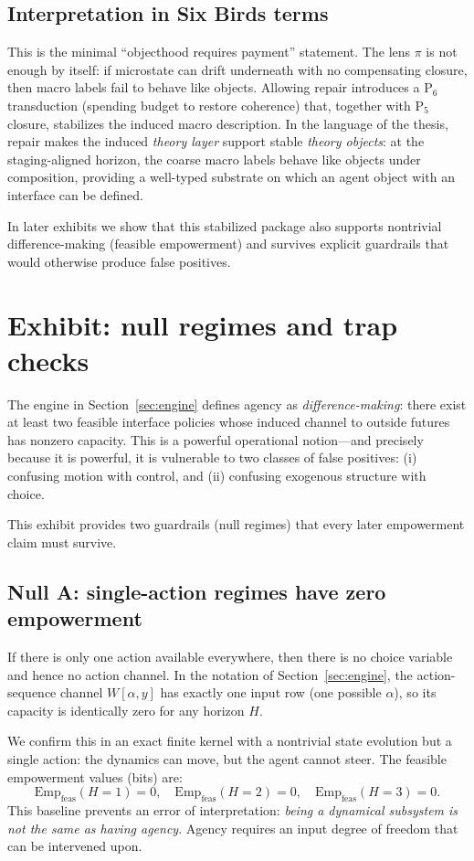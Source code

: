 \documentclass[11pt]{article}
\newcommand{\Emp}{\mathrm{Emp}}
\begin{document}
\subsection{Interpretation in Six Birds terms}
This is the minimal ``objecthood requires payment'' statement. The lens $\pi$ is not enough by itself: if microstate can drift underneath with no compensating closure, then macro labels fail to behave like objects. Allowing repair introduces a P$_6$ transduction (spending budget to restore coherence) that, together with P$_5$ closure, stabilizes the induced macro description. In the language of the thesis, repair makes the induced \emph{theory layer} support stable \emph{theory objects}: at the staging-aligned horizon, the coarse macro labels behave like objects under composition, providing a well-typed substrate on which an agent object with an interface can be defined.

In later exhibits we show that this stabilized package also supports nontrivial difference-making (feasible empowerment) and survives explicit guardrails that would otherwise produce false positives.
 \section{Exhibit: null regimes and trap checks}
\label{sec:ex_nulls}

The engine in Section~\ref{sec:engine} defines agency as \emph{difference-making}: there exist at least two feasible interface policies whose induced channel to outside futures has nonzero capacity. This is a powerful operational notion---and precisely because it is powerful, it is vulnerable to two classes of false positives:
(i) confusing motion with control, and
(ii) confusing exogenous structure with choice.

This exhibit provides two guardrails (null regimes) that every later empowerment claim must survive.

\subsection{Null A: single-action regimes have zero empowerment}
If there is only one action available everywhere, then there is no choice variable and hence no action channel. In the notation of Section~\ref{sec:engine}, the action-sequence channel $W[\alpha,y]$ has exactly one input row (one possible $\alpha$), so its capacity is identically zero for any horizon $H$.

We confirm this in an exact finite kernel with a nontrivial state evolution but a single action: the dynamics can move, but the agent cannot steer. The feasible empowerment values (bits) are:
\[
\Emp_{\mathrm{feas}}(H=1)=0,\quad
\Emp_{\mathrm{feas}}(H=2)=0,\quad
\Emp_{\mathrm{feas}}(H=3)=0.
\]
This baseline prevents an error of interpretation: \emph{being a dynamical subsystem is not the same as having agency}. Agency requires an input degree of freedom that can be intervened upon.
\end{document}
